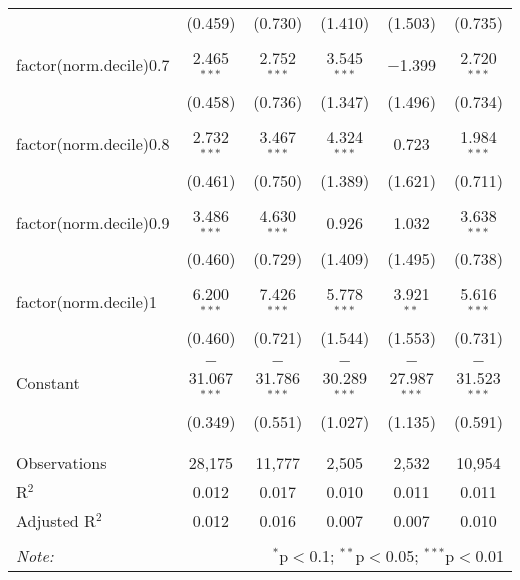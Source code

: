 \begin{table}[!htbp]
\begin{tabular}{@{\extracolsep{5pt}}lccccc}
  & (0.459) & (0.730) & (1.410) & (1.503) & (0.735) \\ 
  & & & & & \\ 
 factor(norm.decile)0.7 & 2.465$^{***}$ & 2.752$^{***}$ & 3.545$^{***}$ & $-$1.399 & 2.720$^{***}$ \\ 
  & (0.458) & (0.736) & (1.347) & (1.496) & (0.734) \\ 
  & & & & & \\ 
 factor(norm.decile)0.8 & 2.732$^{***}$ & 3.467$^{***}$ & 4.324$^{***}$ & 0.723 & 1.984$^{***}$ \\ 
  & (0.461) & (0.750) & (1.389) & (1.621) & (0.711) \\ 
  & & & & & \\ 
 factor(norm.decile)0.9 & 3.486$^{***}$ & 4.630$^{***}$ & 0.926 & 1.032 & 3.638$^{***}$ \\ 
  & (0.460) & (0.729) & (1.409) & (1.495) & (0.738) \\ 
  & & & & & \\ 
 factor(norm.decile)1 & 6.200$^{***}$ & 7.426$^{***}$ & 5.778$^{***}$ & 3.921$^{**}$ & 5.616$^{***}$ \\ 
  & (0.460) & (0.721) & (1.544) & (1.553) & (0.731) \\ 
  & & & & & \\ 
 Constant & $-$31.067$^{***}$ & $-$31.786$^{***}$ & $-$30.289$^{***}$ & $-$27.987$^{***}$ & $-$31.523$^{***}$ \\ 
  & (0.349) & (0.551) & (1.027) & (1.135) & (0.591) \\ 
  & & & & & \\ 
\hline \\[-1.8ex] 
Observations & 28,175 & 11,777 & 2,505 & 2,532 & 10,954 \\ 
R$^{2}$ & 0.012 & 0.017 & 0.010 & 0.011 & 0.011 \\ 
Adjusted R$^{2}$ & 0.012 & 0.016 & 0.007 & 0.007 & 0.010 \\ 
\hline 
\hline \\[-1.8ex] 
\textit{Note:}  & \multicolumn{5}{r}{$^{*}$p$<$0.1; $^{**}$p$<$0.05; $^{***}$p$<$0.01} \\ 
\end{tabular} 
\end{table} 
